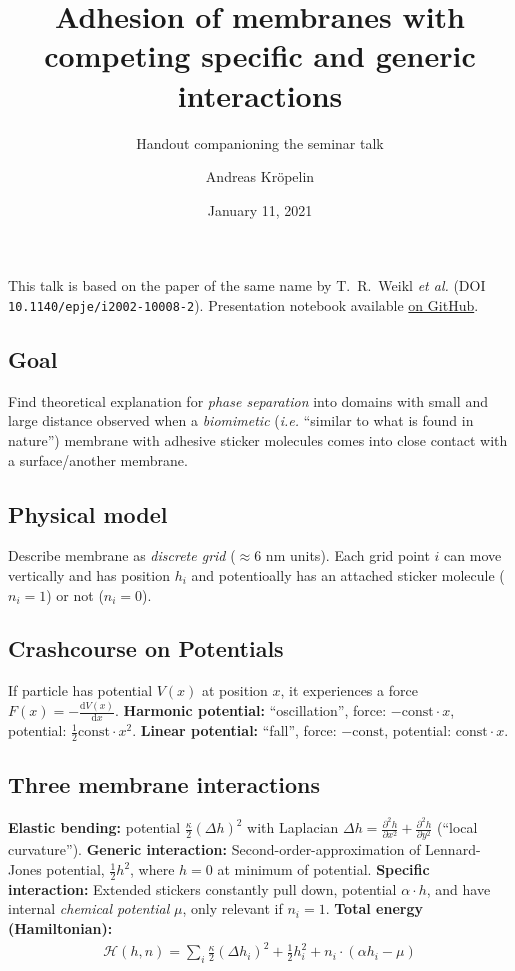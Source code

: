 \documentclass[twocolumn]{scrartcl}
\title{Adhesion of membranes with competing specific and generic interactions}
\subtitle{Handout companioning the seminar talk}
\author{Andreas Kröpelin}
\date{January 11, 2021}
\begin{document}
\maketitle
\thispagestyle{empty}

This talk is based on the paper of the same name by T.~R.~Weikl \textit{et al.} (DOI \texttt{10.1140/\allowbreak{}epje/\allowbreak{}i2002-10008-2}).
Presentation notebook available \href{https://github.com/andreasKroepelin/membrane_adhesion}{on GitHub}.

\subsection*{Goal}
Find theoretical explanation for \emph{phase separation} into domains with small and large distance observed when a \emph{biomimetic} (\textit{i.e.} ``similar to what is found in nature'') membrane with adhesive sticker molecules comes into close contact with a surface/another membrane.

\subsection*{Physical model}
Describe membrane as \emph{discrete grid} ($\approx 6$ nm units).
Each grid point $i$ can move vertically and has position $h_i$ and potentioally has an attached sticker molecule ($n_i = 1$) or not ($n_i = 0$).

\subsection*{Crashcourse on Potentials}
If particle has potential $V(x)$ at position $x$, it experiences a force $F(x) = -\frac{\mathrm{d}V(x)}{\mathrm{d}x}$.
\textbf{Harmonic potential:} ``oscillation'', force: $-\text{const} \cdot x$, potential: $\frac12 \text{const} \cdot x^2$.
\textbf{Linear potential:} ``fall'', force: $-\text{const}$, potential: $\text{const} \cdot x$.

\subsection*{Three membrane interactions}
\textbf{Elastic bending:} potential $\frac{\kappa}{2}(\Delta h)^2$ with Laplacian $\Delta h = \frac{\partial^2 h}{\partial x^2} + \frac{\partial^2 h}{\partial y^2}$ (``local curvature'').
\textbf{Generic interaction:} Second-order-approximation of Lennard-Jones potential, $\frac12 h^2$, where $h=0$ at minimum of potential.
\textbf{Specific interaction:} Extended stickers constantly pull down, potential $\alpha \cdot h$, and have internal \emph{chemical potential} $\mu$, only relevant if $n_i = 1$.
\textbf{Total energy (Hamiltonian):}
\begin{align*}
    \mathcal{H}(h, n) = \sum_i \frac{\kappa}{2}(\Delta h_i)^2 + \frac12 h_i^2 + n_i \cdot (\alpha h_i - \mu)
\end{align*}
\end{document}
